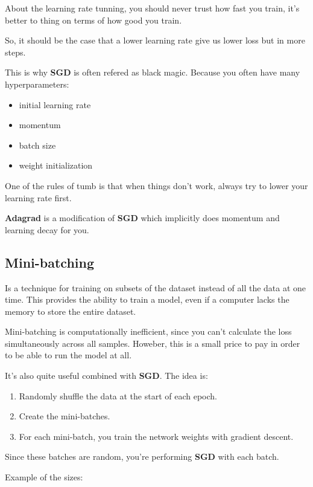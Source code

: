 \documentclass[11pt, a4paper]{article}
\begin{document}
About the learning rate tunning, you should never trust how fast you train, it's better to thing on terms of how good you train. 

So, it should be the case that a lower learning rate give us lower loss but in more steps. 


This is why \textbf{SGD} is often refered as black magic. Because you often have many hyperparameters:

\begin{itemize}
	\item initial learning rate
	\item momentum
	\item batch size
	\item weight initialization
\end{itemize}


One of the rules of tumb is that when things don't work, always try to lower your learning rate first. 

\textbf{Adagrad} is a modification of \textbf{SGD} which implicitly does momentum and learning decay for you. 

\subsection{Mini-batching}%
\label{sub:mini_batching}

Is a technique for training on subsets of the dataset instead of all the data at one time. This provides the ability to train a model, even if a computer lacks the memory to store the entire dataset.


Mini-batching is computationally inefficient, since you can't calculate the loss simultaneously across all samples. Howeber, this is a small price to pay in order to be able to run the model at all.

It's also quite useful combined with \textbf{SGD}. The idea is:

\begin{enumerate}
	\item Randomly shuffle the data at the start of each epoch.
	\item Create the mini-batches.
	\item For each mini-batch, you train the network weights with gradient descent. 
\end{enumerate}

Since these batches are random, you're performing \textbf{SGD} with each batch.

Example of the sizes:
\end{document}
